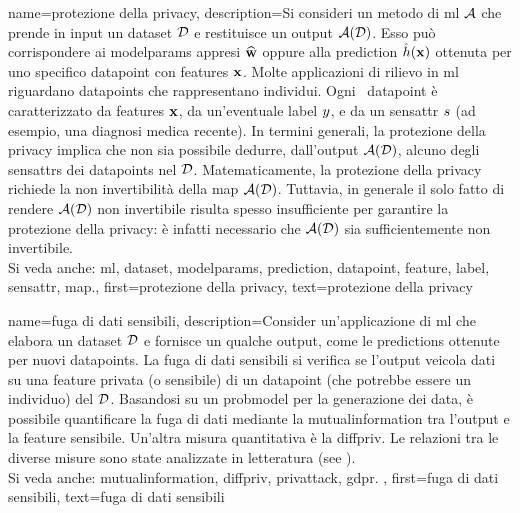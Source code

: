{name={protezione della privacy},
     description={Si consideri un metodo di \gls{ml} $\mathcal{A}$ che prende in 
     input un \gls{dataset} $\mathcal{D}$ e restituisce un output $\mathcal{A}(\mathcal{D})$. Esso può corrispondere ai 
	 	\gls{modelparams} appresi $\widehat{{\bf w}}$ oppure alla \gls{prediction} 
	 	$\hat{h}({\bf x})$ ottenuta per uno specifico \gls{datapoint} con \glspl{feature} 
	 	${\bf x}$. Molte applicazioni di rilievo in \gls{ml} riguardano \glspl{datapoint} 
		che rappresentano individui. Ogni \ \gls{datapoint} è caratterizzato da \glspl{feature} ${\bf x}$, 
		da un’eventuale \gls{label} $y$, e da un \gls{sensattr} $s$ (ad esempio, una diagnosi 
		medica recente). 
		In termini generali, la protezione della privacy implica che non sia possibile dedurre, dall’output 
		$\mathcal{A}(\mathcal{D})$, 
		alcuno degli \glspl{sensattr} dei \glspl{datapoint} nel $\mathcal{D}$. Matematicamente, la protezione 
		della privacy richiede la non invertibilità della \gls{map} $\mathcal{A}(\mathcal{D})$. Tuttavia, in generale il 
		solo fatto di rendere $\mathcal{A}(\mathcal{D})$ non invertibile risulta spesso insufficiente per garantire la 
		protezione della privacy: è infatti necessario che $\mathcal{A}(\mathcal{D})$ sia sufficientemente non 
		invertibile. 
					\\ 
		Si veda anche: \gls{ml}, \gls{dataset}, \gls{modelparams}, \gls{prediction}, \gls{datapoint}, \gls{feature}, \gls{label}, \gls{sensattr}, \gls{map}.}, 
	first={protezione della privacy}, 
	text={protezione della privacy} 
}


{name={fuga di dati sensibili},
	description={Consider un’applicazione di \gls{ml} che elabora un 
		\gls{dataset} $\mathcal{D}$ e fornisce un qualche output, come le \glspl{prediction} 
		ottenute per nuovi \glspl{datapoint}. La fuga di dati sensibili si verifica se l’output 
		veicola dati su una \gls{feature} privata (o sensibile) di un \gls{datapoint} 
		(che potrebbe essere un individuo) del $\mathcal{D}$. Basandosi su un \gls{probmodel} 
		per la generazione dei \gls{data}, è possibile quantificare la fuga di dati mediante la 
		\gls{mutualinformation} 
		tra l’output e la \gls{feature} sensibile. Un’altra misura quantitativa è la \gls{diffpriv}. Le relazioni tra le 
		diverse misure sono state analizzate in letteratura (see \cite{InfThDiffPriv}). 
				\\ 
		Si veda anche: \gls{mutualinformation}, \gls{diffpriv}, \gls{privattack}, \gls{gdpr}. }, 
	first={fuga di dati sensibili}, 
	text={fuga di dati sensibili} 
}



